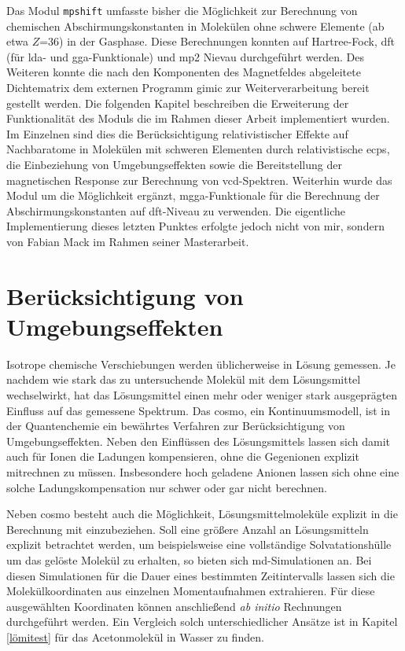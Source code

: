 Das Modul \texttt{mpshift} umfasste bisher die Möglichkeit zur Berechnung von chemischen Abschirmungskonstanten in Molekülen ohne schwere Elemente (ab etwa $Z$=36) in der Gasphase. Diese Berechnungen konnten auf Hartree-Fock, \ac{dft} (für \ac{lda}- und \ac{gga}-Funktionale) und \ac{mp2} Nievau durchgeführt werden. Des Weiteren konnte die nach den Komponenten des Magnetfeldes abgeleitete Dichtematrix dem externen Programm \ac{gimic} zur Weiterverarbeitung bereit gestellt werden. Die folgenden Kapitel beschreiben die Erweiterung der Funktionalität des Moduls die im Rahmen dieser Arbeit implementiert wurden. Im Einzelnen sind dies die Berücksichtigung relativistischer Effekte auf Nachbaratome in Molekülen mit schweren Elementen durch relativistische \acp{ecp}, die Einbeziehung von Umgebungseffekten sowie die Bereitstellung der magnetischen Response zur Berechnung von \ac{vcd}-Spektren. Weiterhin wurde das Modul um die Möglichkeit ergänzt, \ac{mgga}-Funktionale für die Berechnung der Abschirmungskonstanten auf \ac{dft}-Niveau zu verwenden. Die eigentliche Implementierung dieses letzten Punktes erfolgte jedoch nicht von mir, sondern von Fabian Mack im Rahmen seiner Masterarbeit.\supercite{mack2017} 


\section{Berücksichtigung von Umgebungseffekten}\label{umgebung}
Isotrope chemische Verschiebungen werden üblicherweise in Lösung gemessen. Je nachdem wie stark das zu untersuchende Molekül mit dem Lösungsmittel wechselwirkt, hat das Lösungsmittel einen mehr oder weniger stark ausgeprägten Einfluss auf das gemessene Spektrum. Das \acf{cosmo}\supercite{klamt1993cosmo}, ein Kontinuumsmodell, ist in der Quantenchemie ein bewährtes Verfahren zur Berücksichtigung von Umgebungseffekten. Neben den Einflüssen des Lösungsmittels lassen sich damit auch für Ionen die Ladungen kompensieren, ohne die Gegenionen explizit mitrechnen zu müssen. Insbesondere hoch geladene Anionen lassen sich ohne eine solche Ladungskompensation nur schwer oder gar nicht berechnen. 

Neben \ac{cosmo} besteht auch die Möglichkeit, Lösungsmittelmoleküle explizit in die Berechnung mit einzubeziehen. Soll eine größere Anzahl an Lösungsmitteln explizit betrachtet werden, um beispielsweise eine vollständige Solvatationshülle um das gelöste Molekül zu erhalten, so bieten sich \ac{md}-Simulationen an. Bei diesen Simulationen für die Dauer eines bestimmten Zeitintervalls lassen sich die Molekülkoordinaten aus einzelnen Momentaufnahmen extrahieren. Für diese ausgewählten Koordinaten können anschließend \textit{ab initio} Rechnungen durchgeführt werden. Ein Vergleich solch unterschiedlicher Ansätze ist in Kapitel \ref{lömitest} für das Acetonmolekül in Wasser zu finden. 

